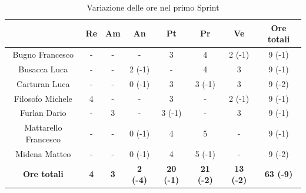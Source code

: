 \begin{table}[H]
  \centering
  \renewcommand{\arraystretch}{1.8}
  \begin{tabular}{c|c|c|c|c|c|c|c}
    \rowcolor[HTML]{125E28}
    \multicolumn{1}{c}{\color[HTML]{FFFFFF}\textbf{ Nominativo }}
                         & \multicolumn{1}{c}{\color[HTML]{FFFFFF}\textbf{ Re }}
                         & \multicolumn{1}{c}{\color[HTML]{FFFFFF}\textbf{ Am}}
                         & \multicolumn{1}{c}{\color[HTML]{FFFFFF}\textbf{ An }}
                         & \multicolumn{1}{c}{\color[HTML]{FFFFFF}\textbf{ Pt }}
                         & \multicolumn{1}{c}{\color[HTML]{FFFFFF}\textbf{ Pr }}
                         & \multicolumn{1}{c}{\color[HTML]{FFFFFF}\textbf{ Ve }}
                         & \multicolumn{1}{c}{\color[HTML]{FFFFFF}\textbf{ Ore totali }}                                                                                                            \\
    \hline
    Bugno Francesco      & -                                                             & -          & -               & 3                & 4                & 2 (-1)           & 9 (-1)           \\
    Busacca Luca         & -                                                             & -          & 2 (-1)          & -                & 4                & 3                & 9 (-1)           \\
    Carturan Luca        & -                                                             & -          & 0 (-1)          & 3                & 3 (-1)           & 3                & 9 (-2)           \\
    Filosofo Michele     & 4                                                             & -          & -               & 3                & -                & 2 (-1)           & 9 (-1)           \\
    Furlan Dario         & -                                                             & 3          & -               & 3 (-1)           & -                & 3                & 9 (-1)           \\
    Mattarello Francesco & -                                                             & -          & 0 (-1)          & 4                & 5                & -                & 9 (-1)           \\
    Midena Matteo        & -                                                             & -          & 0 (-1)          & 4                & 5 (-1)           & -                & 9 (-2)           \\
    \textbf{Ore totali}  & \textbf{4}                                                    & \textbf{3} & \textbf{2 (-4)} & \textbf{20 (-1)} & \textbf{21 (-2)} & \textbf{13 (-2)} & \textbf{63 (-9)}
  \end{tabular}
  \caption{Variazione delle ore nel primo Sprint}
\end{table}

